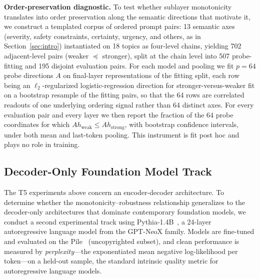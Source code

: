 \documentclass{article}
\theoremstyle{plain}
\theoremstyle{definition}
\theoremstyle{remark}
\begin{document}
\textbf{Order-preservation diagnostic.}
To test whether sublayer monotonicity translates into order preservation along the semantic directions that motivate it, we construct a templated corpus of ordered prompt pairs: 13 semantic axes (severity, safety constraints, certainty, urgency, and others, as in Section~\ref{sec:intro}) instantiated on 18 topics as four-level chains, yielding 702 adjacent-level pairs (weaker $\preceq$ stronger), split at the chain level into 507 probe-fitting and 195 disjoint evaluation pairs. For each model and pooling we fit $p=64$ probe directions $A$ on final-layer representations of the fitting split, each row being an $\ell_2$-regularized logistic-regression direction for stronger-versus-weaker fit on a bootstrap resample of the fitting pairs, so that the 64 rows are correlated readouts of one underlying ordering signal rather than 64 distinct axes. For every evaluation pair and every layer we then report the fraction of the $64$ probe coordinates for which $A h_{\mathrm{weak}} \le A h_{\mathrm{strong}}$, with bootstrap confidence intervals, under both mean and last-token pooling. This instrument is fit post hoc and plays no role in training.

\subsection{Decoder-Only Foundation Model Track}
\label{sec:setup-pythia}
The T5 experiments above concern an encoder-decoder architecture. To determine whether the monotonicity--robustness relationship generalizes to the decoder-only architectures that dominate contemporary foundation models, we conduct a second experimental track using Pythia-1.4B~\citep{biderman2023pythia}, a 24-layer autoregressive language model from the GPT-NeoX family. Models are fine-tuned and evaluated on the Pile~\citep{gao2020pile} (uncopyrighted subset), and clean performance is measured by \emph{perplexity}---the exponentiated mean negative log-likelihood per token---on a held-out sample, the standard intrinsic quality metric for autoregressive language models.
\end{document}
